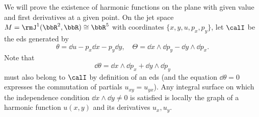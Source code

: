 \begin{example}
    We will prove the existence of harmonic functions on the plane with given value and first derivatives at a given point. On the jet space $M=\rmJ^1(\bbR^2,\bbR)\cong\bbR^5$ with coordinates $\{x,y,u,p_x,p_y\}$, let $\calI$ be the \gls{eds} generated by 
    \[\theta=\dd u-p_x \dd x-p_y\dd y,\quad \Theta=\dd x\wedge \dd p_y-\dd y\wedge\dd p_x.\]
    Note that 
    \[\dd\theta=\dd x\wedge \dd p_x+\dd y\wedge \dd p_y\]
    must also belong to $\calI$ by definition of an \gls{eds} (and the equation $\dd \theta=0$ expresses the commutation of partials $u_{xy}=u_{yx}$). Any integral surface on which the independence condition $\dd x\wedge\dd y\neq 0$ is satisfied is locally the graph of a harmonic function $u(x,y)$ and its derivatives $u_x,u_y$.


\end{example}
